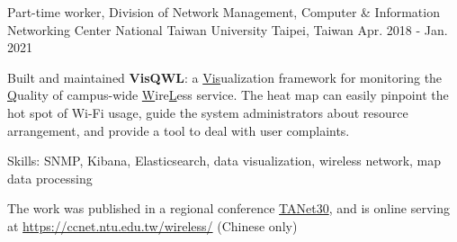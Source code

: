 \begin{cventries}
\cventry
    {Part-time worker, Division of Network Management, Computer \& Information Networking Center}
    {National Taiwan University}
    {Taipei, Taiwan}
    {Apr. 2018 - Jan. 2021}
    {
        \begin{cvitems}
        \item Built and maintained \textbf{VisQWL}: a \ul{Vis}ualization framework for monitoring the \ul{Q}uality of campus-wide \ul{W}ire\ul{L}ess service. The heat map can easily pinpoint the hot spot of Wi-Fi usage, guide the system administrators about resource arrangement, and provide a tool to deal with user complaints.
        \item Skills: SNMP, Kibana, Elasticsearch, data visualization, wireless network, map data processing
        \item The work was published in a regional conference \href{https://tanet2020.ntu.edu.tw/index30.php}{TANet30}, and is online serving at \href{https://ccnet.ntu.edu.tw/wireless/}{https://ccnet.ntu.edu.tw/wireless/} (Chinese only)
        \end{cvitems}
    }
\end{cventries}
